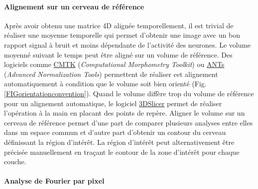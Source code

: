 \paragraph{Alignement sur un cerveau de référence}

Après avoir obtenu une matrice 4D alignée temporellement, il est trivial de réaliser une moyenne temporelle qui permet d'obtenir une image avec un bon rapport signal à bruit et moins dépendante de l'activité des neurones. Le volume moyenné suivant le temps peut être aligné sur un volume de référence. Des logiciels comme \href{https://www.nitrc.org/projects/cmtk}{CMTK} (\emph{Computational Morphometry Toolkit}) ou \href{https://stnava.github.io/ANTs/}{ANTs} (\emph{Advanced Normalization Tools}) permettent de réaliser cet alignement automatiquement à condition que le volume soit bien orienté (Fig. \ref{FIGorientationconvention}). Quand le volume diffère trop du volume de référence pour un alignement automatique, le logiciel \href{https://www.slicer.org/}{3DSlicer} permet de réaliser l'opération à la main en placant des points de repère.
Aligner le volume sur un cerveau de référence permet d'une part de comparer plusieurs analyses entre elles dans un espace commun et d'autre part d'obtenir un contour du cerveau définissant la région d'intérêt. La région d'intérêt peut alternativement être précisée manuellement en traçant le contour de la zone d'intérêt pour chaque couche. 



\paragraph{Analyse de Fourier par pixel}

